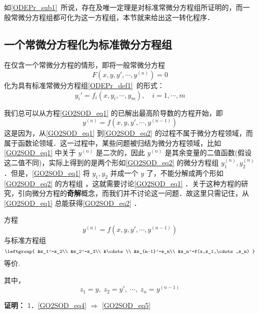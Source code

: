 
如\autoref{ODEPr_sub1}~所说，存在及唯一定理是对标准常微分方程组所证明的，而一般常微分方程组都可化为这一方程组，本节就来给出这一转化程序．

\subsection{一个常微分方程化为标准微分方程组}
在仅含一个常微分方程的情形，即将一般常微分方程
\begin{equation}\label{GO2SOD_eq1}
F(x,y,y',\cdots,y^{(n)})=0
\end{equation}
化为具有标准常微分方程组\autoref{ODEPr_def1}~的形式：
\begin{equation}\label{GO2SOD_eq3}
y_i'=f_i(x,y_i,\cdots,y_m),\quad i=1,\cdots,m
\end{equation}

我们总可以从方程\autoref{GO2SOD_eq1} 的已解出最高阶导数的方程开始，即
\begin{equation}\label{GO2SOD_eq2}
y^{(n)}=f(x,y,y',\cdots,y^{(n-1)})
\end{equation}
这是因为，从\autoref{GO2SOD_eq1} 到\autoref{GO2SOD_eq2} 的过程不属于微分方程领域，而属于函数论领域．这一过程中，某些问题被归结为微分方程领域，比如\autoref{GO2SOD_eq1} 中关于 $y^{(n)}$ 是二次的，因此 $y^{(n)}$ 是其余变量的二值函数(假设这二值不同)，实际上得到的是两个形如\autoref{GO2SOD_eq2} 的微分方程组 $y_1^{(n)},y_2^{(n)}$．但是，\autoref{GO2SOD_eq1} 将 $y_1,y_2$ 并成一个 $y$ 了，不能分解成两个形如\autoref{GO2SOD_eq2} 的方程组 ，这就需要讨论\autoref{GO2SOD_eq1} ．关于这种方程的研究，引向微分方程的\textbf{奇解}概念，而我们并不讨论这一问题．故这里只需记住，从\autoref{GO2SOD_eq1} 总能获得\autoref{GO2SOD_eq2} ．
\begin{theorem}{}\label{GO2SOD_the1}
方程
\begin{equation}\label{GO2SOD_eq4}
y^{(n)}=f(x,y,y',\cdots,y^{(n-1)})
\end{equation}
与标准方程组
\begin{equation}\label{GO2SOD_eq5}
\leftgroup{
&z_1'=z_2\\
&z_2'=z_3\\
&\cdots\\
&z_{n-1}'=z_n\\
&z_n'=f(x,z_1,\cdots,z_n)
}
\end{equation}
等价.

其中，
\begin{equation}\label{GO2SOD_eq6}
z_1=y,\;z_2=y',\;\cdots,\;z_n=y^{(n-1)}
\end{equation}
\end{theorem}
\textbf{证明：}
1．\autoref{GO2SOD_eq4} $\Rightarrow$ \autoref{GO2SOD_eq5} 

